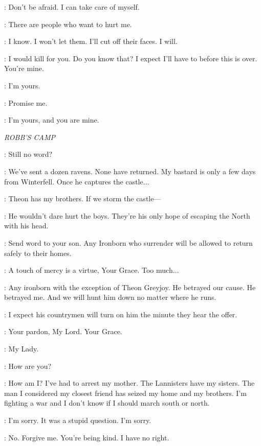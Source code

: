 \SHAE: Don't be afraid. I can take care of myself. 

\TYRION: There are people who want to hurt me. 

\SHAE: I know. I won't let them. I'll cut off their faces. I will. 

\TYRION: I would kill for you. Do you know that? I expect I'll have to before this is over. You're mine. 

\SHAE: I'm yours. 

\TYRION: Promise me. 

\SHAE: I'm yours, and you are mine. 


\scene

\textit{ROBB'S CAMP} 


\ROBB: Still no word? 

\ROOSE: We've sent a dozen ravens. None have returned. My bastard is only a few days from Winterfell. Once he captures the castle$\ldots$  

\ROBB: Theon has my brothers. If we storm the castle---  

\ROOSE: He wouldn't dare hurt the boys. They're his only hope of escaping the North with his head. 

\ROBB: Send word to your son. Any Ironborn who surrender will be allowed to return safely to their homes. 

\ROOSE: A touch of mercy is a virtue, Your Grace. Too much$\ldots$  

\ROBB: Any ironborn with the exception of Theon Greyjoy. He betrayed our cause. He betrayed me. And we will hunt him down no matter where he runs. 

\ROOSE: I expect his countrymen will turn on him the minute they hear the offer. 


\TALISA: Your pardon, My Lord. Your Grace. 

\ROOSE: My Lady. 


\TALISA: How are you? 

\ROBB: How am I? I've had to arrest my mother. The Lannisters have my sisters. The man I considered my closest friend has seized my home and my brothers. I'm fighting a war and I don't know if I should march south or north. 

\TALISA: I'm sorry. It was a stupid question. I'm sorry. 

\ROBB: No. Forgive me. You're being kind. I have no right. 

